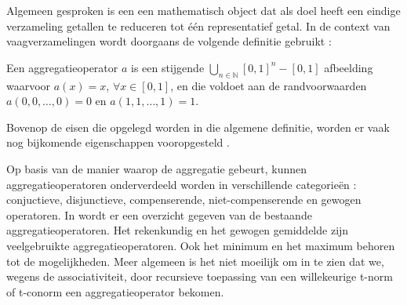 Algemeen gesproken is een  een mathematisch object dat als doel heeft
een eindige verzameling getallen te reduceren tot \'e\'en representatief getal. In de context van 
vaagverzamelingen wordt doorgaans de volgende definitie gebruikt 
\cite{detyniecki:numerical_aggregation_operators}:
\begin{definitie}
Een aggregatieoperator $a$ is een stijgende $\bigcup_{n \in \mathbb{N}}[0,1]^n - [0,1]$ afbeelding
waarvoor $a(x)=x$, $\forall x \in [0,1]$, en die voldoet aan de randvoorwaarden 
$a(0,0,\ldots,0)=0$ en $a(1,1,\ldots,1)=1$.
\end{definitie}
\noindent
Bovenop de eisen die opgelegd worden in die algemene definitie, worden er vaak nog
bijkomende eigenschappen vooropgesteld 
\cite{detyniecki:numerical_aggregation_operators, grabisch:fuzzy_aggregation_of_numerical_preferences, victor:aggregatieoperatoren}.

Op basis van de manier waarop de aggregatie gebeurt, kunnen aggregatieoperatoren onderverdeeld
worden in verschillende categorie\"en \cite{grabisch:fuzzy_aggregation_of_numerical_preferences}:
conjuctieve, disjunctieve, compenserende, niet-compenserende en gewogen operatoren.
In \cite{detyniecki:numerical_aggregation_operators} wordt er een overzicht gegeven van
de bestaande aggregatieoperatoren. Het rekenkundig en het gewogen gemiddelde zijn
veelgebruikte aggregatieoperatoren. Ook het minimum en het maximum behoren
tot de mogelijkheden. Meer algemeen is het niet moeilijk om in te zien 
dat we, wegens de associativiteit, door recursieve toepassing van een willekeurige
t-norm of t-conorm een aggregatieoperator bekomen.
